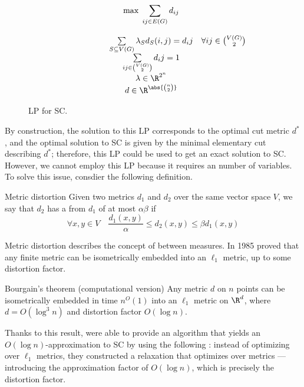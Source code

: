 \documentclass[a4paper, 12pt]{report}
\begin{document}
    \begin{figure}[H]
        \centering
        \[\begin{array}{ccl}
            \qquad\qquad\quad
            & \max \; \displaystyle \sum_{ij \in E(G)}{d_{ij}} \\\\
            & \sum\limits_{S \subseteq V(G)}{\lambda_Sd_S(i, j)}  = d_ij & \forall ij \in \binom{V(G)}{2} \\
            & \sum\limits_{ij \in \binom{V(G)}{2}}{d_ij} = 1 \\
            & \lambda \in \R^{2^n} \\
            & d \in \R^{\abs{\binom{n}{2}}} \\
        \end{array}\]
        \caption{LP for SC.}
    \end{figure}

    By construction, the solution to this LP corresponds to the optimal cut metric $d^*$, and the optimal solution to SC is given by the minimal elementary cut describing $d^*$; therefore, this LP could be used to get an exact solution to SC. However, we cannot employ this LP because it requires an  number of variables. To solve this issue, consdier the following definition.

    \begin{frameddefn}{Metric distortion}
        Given two metrics $d_1$ and $d_2$ over the same vector space $V$, we say that $d_2$ has a  from $d_1$ of at most $\alpha \beta$ if $$\forall x, y \in V \quad \dfrac{d_1(x, y)}{\alpha} \le d_2(x, y) \le \beta d_1(x, y)$$
    \end{frameddefn}

    Metric distortion describes the concept of  between measures. In 1985 \textcite{bourgain} proved that any finite metric can be isometrically embedded into an $\ell_1$ metric, up to some distortion factor.

    \begin{framedthm}[label={bourgain}]{Bourgain's theorem (computational version)}
        Any metric $d$ on $n$ points can be isometrically embedded in time $n^O(1)$ into an $\ell_1$ metric on $\R^d$, where $d = O(\log^3 n)$ and distortion factor $O(\log n)$.
    \end{framedthm}

    Thanks to this result, \textcite{leightonrao} were able to provide an algorithm that yields an $O(\log n)$-approximation to SC by using the following : instead of optimizing over $\ell_1$ metrics, they constructed a relaxation that optimizes over  metrics --- introducing the approximation factor of $O(\log n)$, which is precisely the distortion factor.
\end{document}
